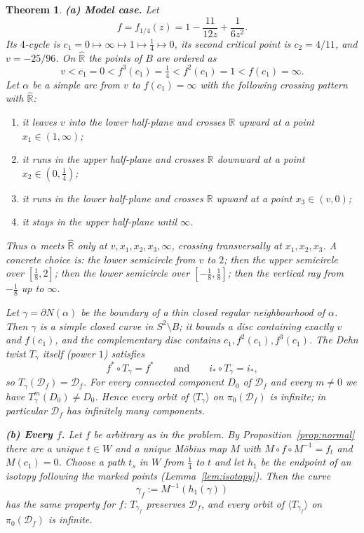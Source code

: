 \documentclass[11pt]{article}
\newtheorem{theorem}{Theorem}
\theoremstyle{definition}
\newcommand{\Rh}{\hat{\mathbb R}}
\newcommand{\D}{\mathcal D}
\begin{document}
\begin{theorem}\label{thm:main}
\textbf{(a) Model case.} Let
\[f=f_{1/4}(z)=1-\frac{11}{12z}+\frac1{6z^2}.\]
Its $4$-cycle is $c_1=0\mapsto\infty\mapsto1\mapsto\tfrac14\mapsto0$, its second critical point is $c_2=4/11$, and $v=-25/96$. On $\Rh$ the points of $B$ are ordered as
\[v<c_1=0<f^{3}(c_1)=\tfrac14<f^{2}(c_1)=1<f(c_1)=\infty .\]
Let $\alpha$ be a simple arc from $v$ to $f(c_1)=\infty$ with the following crossing pattern with $\Rh$:
\begin{enumerate}[label=\textup{(\arabic*)}]
\item it leaves $v$ into the lower half-plane and crosses $\mathbb R$ upward at a point $x_1\in(1,\infty)$;
\item it runs in the upper half-plane and crosses $\mathbb R$ downward at a point $x_2\in(0,\tfrac14)$;
\item it runs in the lower half-plane and crosses $\mathbb R$ upward at a point $x_3\in(v,0)$;
\item it stays in the upper half-plane until $\infty$.
\end{enumerate}
Thus $\alpha$ meets $\Rh$ only at $v,x_1,x_2,x_3,\infty$, crossing transversally at $x_1,x_2,x_3$. A concrete choice is: the lower semicircle from $v$ to $2$; then the upper semicircle over $[\tfrac18,2]$; then the lower semicircle over $[-\tfrac18,\tfrac18]$; then the vertical ray from $-\tfrac18$ up to $\infty$.

Let $\gamma=\partial N(\alpha)$ be the boundary of a thin closed regular neighbourhood of $\alpha$. Then $\gamma$ is a simple closed curve in $S^2\setminus B$; it bounds a disc containing exactly $v$ and $f(c_1)$, and the complementary disc contains $c_1,f^2(c_1),f^3(c_1)$. The Dehn twist $T_\gamma$ itself (power $1$) satisfies
\[f^*\circ T_\gamma=f^*\qquad\text{and}\qquad i_*\circ T_\gamma=i_*,\]
so $T_\gamma(\D_f)=\D_f$. For every connected component $D_0$ of $\D_f$ and every $m\ne0$ we have $T_\gamma^m(D_0)\ne D_0$. Hence every orbit of $\langle T_\gamma\rangle$ on $\pi_0(\D_f)$ is infinite; in particular $\D_f$ has infinitely many components.

\smallskip
\textbf{(b) Every $f$.} Let $f$ be arbitrary as in the problem. By Proposition~\ref{prop:normal} there are a unique $t\in W$ and a unique M\"obius map $M$ with $M\circ f\circ M^{-1}=f_t$ and $M(c_1)=0$. Choose a path $t_s$ in $W$ from $\tfrac14$ to $t$ and let $h_1$ be the endpoint of an isotopy following the marked points (Lemma~\ref{lem:isotopy}). Then the curve
\[\gamma_f:=M^{-1}(h_1(\gamma))\]
has the same property for $f$: $T_{\gamma_f}$ preserves $\D_f$, and every orbit of $\langle T_{\gamma_f}\rangle$ on $\pi_0(\D_f)$ is infinite.


\end{theorem}
\end{document}
